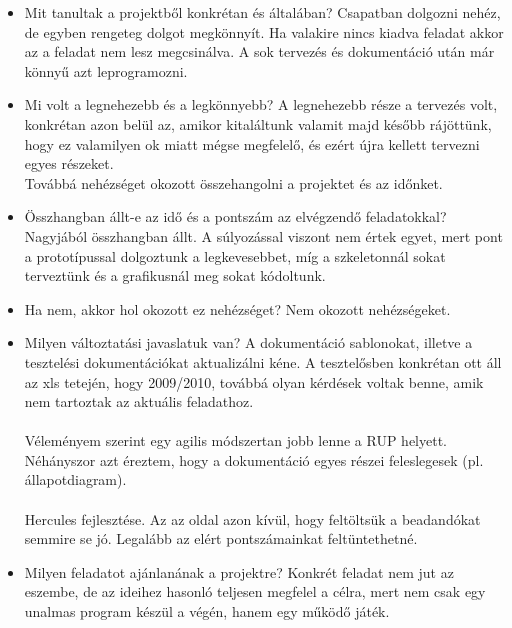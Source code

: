 \begin{itemize}
\item Mit tanultak a projektből konkrétan és általában? \newline
Csapatban dolgozni nehéz, de egyben rengeteg dolgot megkönnyít. Ha valakire nincs kiadva feladat akkor az a feladat nem lesz megcsinálva.
A sok tervezés és dokumentáció után már könnyű azt leprogramozni.
\item Mi volt a legnehezebb és a legkönnyebb? \newline
A legnehezebb része a tervezés volt, konkrétan azon belül az, amikor kitaláltunk valamit majd később rájöttünk, hogy ez valamilyen ok miatt mégse megfelelő, és ezért újra kellett tervezni egyes részeket.\\
Továbbá nehézséget okozott összehangolni a projektet és az időnket.
\item Összhangban állt-e az idő és a pontszám az elvégzendő feladatokkal? \newline
Nagyjából összhangban állt. A súlyozással viszont nem értek egyet, mert pont a prototípussal dolgoztunk a legkevesebbet, míg a szkeletonnál sokat terveztünk és a grafikusnál meg sokat kódoltunk.\\
\item Ha nem, akkor hol okozott ez nehézséget? \newline
Nem okozott nehézségeket.
\item Milyen változtatási javaslatuk van? \newline
A dokumentáció sablonokat, illetve a tesztelési dokumentációkat aktualizálni kéne. A tesztelősben konkrétan ott áll az xls tetején, hogy 2009/2010, továbbá olyan kérdések voltak benne, amik nem tartoztak az aktuális feladathoz.\\\\
Véleményem szerint egy agilis módszertan jobb lenne a RUP helyett. Néhányszor azt éreztem, hogy a dokumentáció egyes részei feleslegesek (pl. állapotdiagram).\\\\
Hercules fejlesztése. Az az oldal azon kívül, hogy feltöltsük a beadandókat semmire se jó. Legalább az elért pontszámainkat feltüntethetné.
\item Milyen feladatot ajánlanának a projektre? \newline
Konkrét feladat nem jut az eszembe, de az ideihez hasonló teljesen megfelel a célra, mert nem csak egy unalmas program készül a végén, hanem egy működő játék.

\end{itemize}



